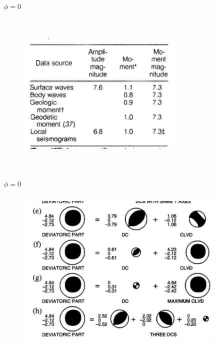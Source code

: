 \documentclass{beamer}
\begin{document}
\begin{frame}{$\phi = 0$}
	\begin{figure}[htb]
		\centering
		\includegraphics[width= 8cm, height= 8cm]{kanamori}
	\end{figure}
\end{frame}

\begin{frame}{$\phi = 0$}
	\begin{figure}[htb]
		\centering
		\includegraphics[width= 10cm, height= 8cm]{fig322}
	\end{figure}
\end{frame}
\end{document}
